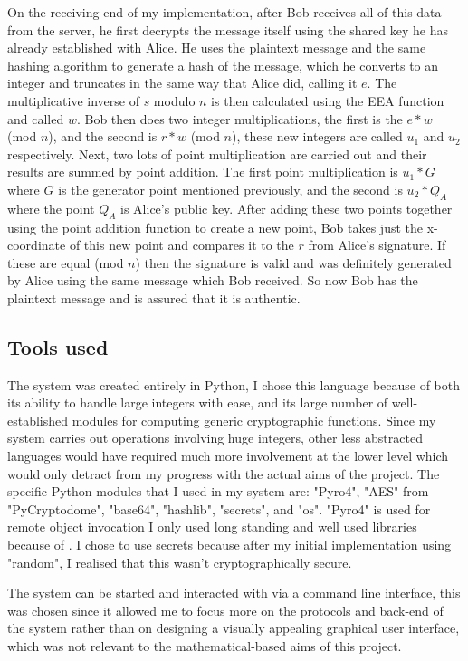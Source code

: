 \documentclass[12pt,a4paper]{article}
\begin{document}
On the receiving end of my implementation, after Bob receives all of this data from the server, 
he first decrypts the message itself using the shared key he has already established with Alice. 
He uses the plaintext message and the same hashing algorithm to generate a hash of the message, 
which he converts to an integer and truncates in the same way that Alice did, calling it $e$. 
The multiplicative inverse of $s$ modulo $n$ is then calculated using the EEA function and called $w$. 
Bob then does two integer multiplications, the first is the $e*w$ (mod $n$), 
and the second is $r*w$ (mod $n$), these new integers are called $u_1$ and $u_2$ respectively. 
Next, two lots of point multiplication are carried out and their results are summed by point addition. 
The first point multiplication is $u_1*G$ where $G$ is the generator point mentioned previously, 
and the second is $u_2*Q_A$ where the point $Q_A$ is Alice's public key. 
After adding these two points together using the point addition function to create a new point, 
Bob takes just the x-coordinate of this new point and compares it to the $r$ from Alice's signature. 
If these are equal (mod $n$) then the signature is valid and was definitely generated by Alice using the same message which Bob received. 
So now Bob has the plaintext message and is assured that it is authentic. 


\subsection{Tools used} \label{Tools}
The system was created entirely in Python, I chose this language because of both its ability to handle large integers with ease, 
and its large number of well-established modules for computing generic cryptographic functions. 
Since my system carries out operations involving huge integers, other less abstracted languages would 
have required much more involvement at the lower level which would only detract from my progress with the actual aims of the project. 
The specific Python modules that I used in my system are: "Pyro4", "AES" from "PyCryptodome", "base64", "hashlib", "secrets", and "os". 
"Pyro4" is used for remote object invocation
I only used long standing and well used libraries because of \cite{ducklin2021python}. 
I chose to use secrets because after my initial implementation using "random", I realised that this wasn't cryptographically secure. 

The system can be started and interacted with via a command line interface, this was chosen since it allowed me to focus 
more on the protocols and back-end of the system rather than on designing a visually appealing graphical user interface, 
which was not relevant to the mathematical-based aims of this project. 
\end{document}
